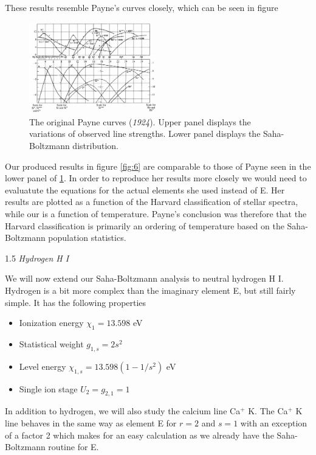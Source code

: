 \documentclass[a4paper,11.5pt,]{article}
\begin{document}
\begin{multicols}{2}
These results resemble Payne's curves closely, which can be seen in figure 

\begin{figure}[H]
	\centering
	\includegraphics[width=0.5\textwidth]{SSA/figures/Payne.png}
	\caption{The original Payne curves (\textit{1924}). Upper panel displays the variations of observed line strengths. Lower panel displays the Saha-Boltzmann distribution.}
	\label{fig:7}
\end{figure}

Our produced results in figure \ref{fig:6} are comparable to those of Payne seen in the lower panel of \ref{fig:7}. In order to reproduce her results more closely we would need to evaluatute the equations for the actual elements she used instead of E. Her results are plotted as a function of the Harvard classification of stellar spectra, while our is a function of temperature. Payne's conclusion was therefore that the Harvard classification is primarily an ordering of temperature based on the Saha-Boltzmann population statistics.

\begin{center}
1.5\textit{ Hydrogen H I}
\end{center}
We will now extend our Saha-Boltzmann analysis to neutral hydrogen H I. Hydrogen is a bit more complex than the imaginary element E, but still fairly simple. It has the following properties

\begin{itemize}
    \item Ionization energy $ \chi_1 = 13.598$ eV
    \item Statistical weight $g_{1,s} = 2 s^2$
    \item Level energy $\chi_{1,s} = 13.598(1 - 1/s^2)$ eV
    \item Single ion stage $U_2 = g_{2,1} = 1$
\end{itemize}

\noindent In addition to hydrogen, we will also study the calcium line Ca$^+$ K. The Ca$^+$ K line behaves in the same way as element E for $r=2$ and $s=1$ with an exception of a factor 2 which makes for an easy calculation as we already have the Saha-Boltzmann routine for E.


\end{multicols}
\end{document}
